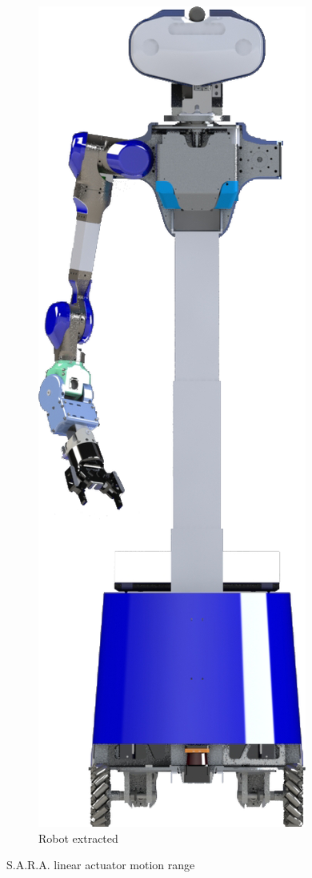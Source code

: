 \documentclass[runningheads,a4paper]{llncs}
\begin{document}
\begin{figure}[h!]
  \hspace{1.5cm}
  \begin{subfigure}[b]{0.15\linewidth}
    \includegraphics[width=\linewidth]{images/sara_render_extracted.png}
    \caption{Robot extracted}
  \end{subfigure}
  \caption{S.A.R.A. linear actuator motion range}
  \label{fig:coffee}
\end{figure}
\end{document}
